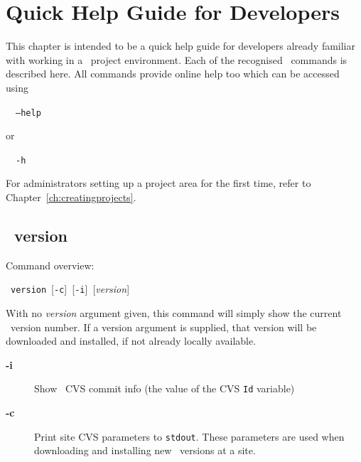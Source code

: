 \newcommand{\cmdintro}{Command overview}
\chapter{Quick Help Guide for Developers}
\label{ch:quickhelpguide}
This chapter is intended to be a quick help guide for developers
already familiar with working in a \scram\ project environment.  Each
of the recognised \scram\ commands is described here.
All commands provide online help too which can be accessed using

\hspace{5mm}\scram~~\texttt{--help} 

or

\hspace{5mm}\scram~~\texttt{-h} 

\ni For administrators setting up a project area for the first time,
refer to Chapter~\ref{ch:creatingprojects}.

\section{\scram\ version}

\cmdintro:

\hspace{5mm}\scram~\texttt{version}~[\texttt{-c}]~[\texttt{-i}]~[\textit{version}]

\ni With no \textit{version} argument given, this command will simply show
the current \scram\ version number. If a version argument is supplied,
that version will be downloaded and installed, if not already locally available.

\begin{description}
\item[\textbf{-i}]
  Show \scram\ CVS commit info (the value of the CVS \texttt{Id} variable)
\item[\textbf{-c}]
  Print site CVS parameters to \texttt{stdout}. These parameters are used
  when downloading and installing new \scram\ versions at a site.
\end{description}


